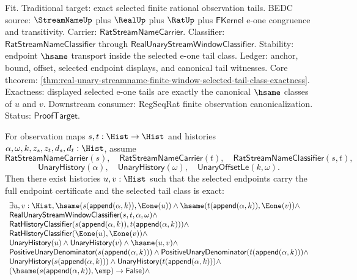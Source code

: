 Fit. Traditional target: exact selected finite rational observation tails. BEDC
source: $\StreamNameUp$ plus $\RealUp$ plus $\RatUp$ plus $\mathsf{FKernel}$
e-one congruence and transitivity. Carrier:
$\mathsf{RatStreamNameCarrier}$. Classifier:
$\mathsf{RatStreamNameClassifier}$ through
$\mathsf{RealUnaryStreamWindowClassifier}$. Stability: endpoint $\hsame$
transport inside the selected e-one tail class. Ledger: anchor, bound, offset,
selected endpoint displays, and canonical tail witnesses. Core theorem:
\autoref{thm:real-unary-streamname-finite-window-selected-tail-class-exactness}.
Exactness: displayed selected e-one tails are exactly the canonical $\hsame$
classes of $u$ and $v$. Downstream consumer: RegSeqRat finite observation
canonicalization. Status: $\mathsf{ProofTarget}$.

\begin{theorem}
\label{thm:real-unary-streamname-finite-window-selected-full-tail-class-certificate}
For observation maps $s,t:\Hist\to\Hist$ and histories
$\alpha,\omega,k,z_s,z_t,d_s,d_t:\Hist$, assume
$$
\mathsf{RatStreamNameCarrier}(s),\quad
\mathsf{RatStreamNameCarrier}(t),\quad
\mathsf{RatStreamNameClassifier}(s,t),
$$
$$
\mathsf{UnaryHistory}(\alpha),\quad
\mathsf{UnaryHistory}(\omega),\quad
\mathsf{UnaryOffsetLe}(k,\omega).
$$
Then there exist histories $u,v:\Hist$ such that the selected endpoints carry
the full endpoint certificate and the selected tail class is exact:
$$
\begin{array}{l}
\exists u,v:\Hist,
\hsame(s(\mathsf{append}(\alpha,k)),\Eone(u))\land
\hsame(t(\mathsf{append}(\alpha,k)),\Eone(v))\land\\
\mathsf{RealUnaryStreamWindowClassifier}(s,t,\alpha,\omega)\land\\
\mathsf{RatHistoryClassifier}(s(\mathsf{append}(\alpha,k)),t(\mathsf{append}(\alpha,k)))\land\\
\mathsf{RatHistoryClassifier}(\Eone(u),\Eone(v))\land\\
\mathsf{UnaryHistory}(u)\land\mathsf{UnaryHistory}(v)\land\hsame(u,v)\land\\
\mathsf{PositiveUnaryDenominator}(s(\mathsf{append}(\alpha,k)))\land
\mathsf{PositiveUnaryDenominator}(t(\mathsf{append}(\alpha,k)))\land\\
\mathsf{UnaryHistory}(s(\mathsf{append}(\alpha,k)))\land
\mathsf{UnaryHistory}(t(\mathsf{append}(\alpha,k)))\land\\
(\hsame(s(\mathsf{append}(\alpha,k)),\emp)\to\mathsf{False})\land

\end{array}$$
\end{theorem}
